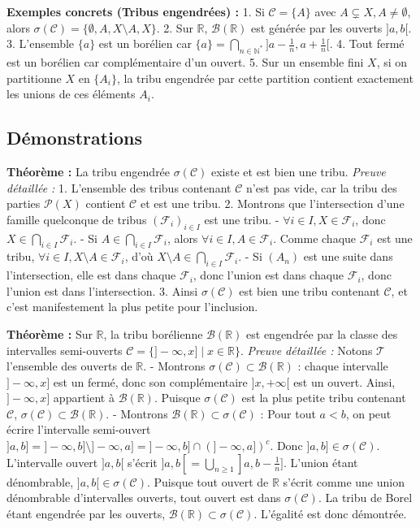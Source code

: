 \documentclass[11pt,a4paper]{article}
\begin{document}
\textbf{Exemples concrets (Tribus engendrées) :}
1. Si $\mathcal{C} = \{A\}$ avec $A \subsetneq X, A \neq \emptyset$, alors $\sigma(\mathcal{C}) = \{\emptyset, A, X \setminus A, X\}$.
2. Sur $\mathbb{R}$, $\mathcal{B}(\mathbb{R})$ est générée par les ouverts $]a, b[$.
3. L'ensemble $\{a\}$ est un borélien car $\{a\} = \bigcap_{n \in \mathbb{N}^*} ]a - \frac{1}{n}, a + \frac{1}{n}[$.
4. Tout fermé est un borélien car complémentaire d'un ouvert.
5. Sur un ensemble fini $X$, si on partitionne $X$ en $\{A_i\}$, la tribu engendrée par cette partition contient exactement les unions de ces éléments $A_i$.

\subsection{Démonstrations}

\textbf{Théorème :} La tribu engendrée $\sigma(\mathcal{C})$ existe et est bien une tribu.
\textit{Preuve détaillée :}
1. L'ensemble des tribus contenant $\mathcal{C}$ n'est pas vide, car la tribu des parties $\mathcal{P}(X)$ contient $\mathcal{C}$ et est une tribu.
2. Montrons que l'intersection d'une famille quelconque de tribus $(\mathcal{F}_i)_{i \in I}$ est une tribu.
   - $\forall i \in I, X \in \mathcal{F}_i$, donc $X \in \bigcap_{i \in I} \mathcal{F}_i$.
   - Si $A \in \bigcap_{i \in I} \mathcal{F}_i$, alors $\forall i \in I, A \in \mathcal{F}_i$. Comme chaque $\mathcal{F}_i$ est une tribu, $\forall i \in I, X \setminus A \in \mathcal{F}_i$, d'où $X \setminus A \in \bigcap_{i \in I} \mathcal{F}_i$.
   - Si $(A_n)$ est une suite dans l'intersection, elle est dans chaque $\mathcal{F}_i$, donc l'union est dans chaque $\mathcal{F}_i$, donc l'union est dans l'intersection.
3. Ainsi $\sigma(\mathcal{C})$ est bien une tribu contenant $\mathcal{C}$, et c'est manifestement la plus petite pour l'inclusion.

\textbf{Théorème :} Sur $\mathbb{R}$, la tribu borélienne $\mathcal{B}(\mathbb{R})$ est engendrée par la classe des intervalles semi-ouverts $\mathcal{C} = \{ ]-\infty, x] \mid x \in \mathbb{R} \}$.
\textit{Preuve détaillée :}
Notons $\mathcal{T}$ l'ensemble des ouverts de $\mathbb{R}$.
- Montrons $\sigma(\mathcal{C}) \subset \mathcal{B}(\mathbb{R})$ : chaque intervalle $]-\infty, x]$ est un fermé, donc son complémentaire $]x, +\infty[$ est un ouvert. Ainsi, $]-\infty, x]$ appartient à $\mathcal{B}(\mathbb{R})$. Puisque $\sigma(\mathcal{C})$ est la plus petite tribu contenant $\mathcal{C}$, $\sigma(\mathcal{C}) \subset \mathcal{B}(\mathbb{R})$.
- Montrons $\mathcal{B}(\mathbb{R}) \subset \sigma(\mathcal{C})$ :
  Pour tout $a < b$, on peut écrire l'intervalle semi-ouvert $]a, b] = ]-\infty, b] \setminus ]-\infty, a] = ]-\infty, b] \cap (]-\infty, a])^c$. Donc $]a, b] \in \sigma(\mathcal{C})$.
  L'intervalle ouvert $]a, b[$ s'écrit $]a, b[ = \bigcup_{n \geq 1} ]a, b - \frac{1}{n}]$. L'union étant dénombrable, $]a, b[ \in \sigma(\mathcal{C})$.
  Puisque tout ouvert de $\mathbb{R}$ s'écrit comme une union dénombrable d'intervalles ouverts, tout ouvert est dans $\sigma(\mathcal{C})$. La tribu de Borel étant engendrée par les ouverts, $\mathcal{B}(\mathbb{R}) \subset \sigma(\mathcal{C})$.
L'égalité est donc démontrée.
\end{document}
